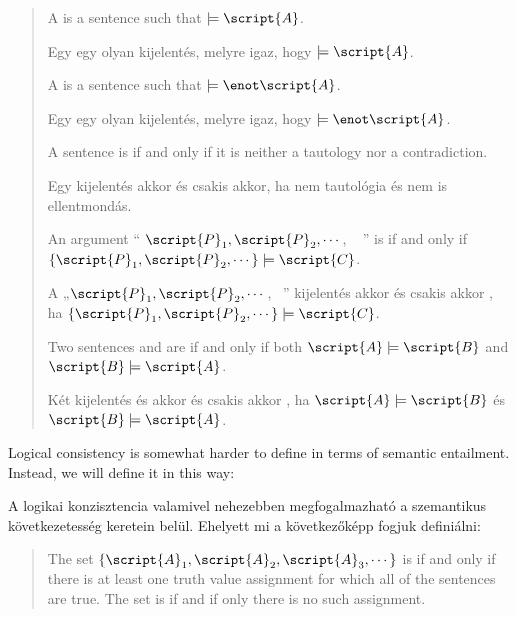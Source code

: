 
\begin{quote}
A  is a sentence   such that $\models\script{A}$.

Egy  egy olyan  kijelentés, melyre igaz, hogy $\models\script{A}$.

A  is a sentence  such that $\models\enot\script{A}$.

Egy   egy olyan  kijelentés, melyre igaz, hogy $\models\enot\script{A}$.

A sentence is  if and only if it is neither a tautology nor a contradiction.

Egy kijelentés  akkor és csakis akkor, ha nem tautológia és nem is ellentmondás.

An argument `` $\script{P}_1, \script{P}_2, \cdots$, \therefore\  '' is  if and only if $\{\script{P}_1,\script{P}_2,\cdots\}\models\script{C}$.

A „$\script{P}_1, \script{P}_2, \cdots$, \therefore\ ” kijelentés akkor és csakis akkor , ha $\{\script{P}_1,\script{P}_2,\cdots\}\models\script{C}$.

Two sentences  and  are  if and only if both $\script{A}\models\script{B}$ and $\script{B}\models\script{A}$.

Két kijelentés  és  akkor és csakis akkor , ha $\script{A}\models\script{B}$ és $\script{B}\models\script{A}$.
\end{quote}

Logical consistency is somewhat harder to define in terms of semantic entailment. Instead, we will define it in this way:

A logikai konzisztencia valamivel nehezebben megfogalmazható a szemantikus következetesség keretein belül. Ehelyett mi a következőképp fogjuk definiálni:

\begin{quote}
\label{def.consistencySL}
The set $\{\script{A}_1,\script{A}_2,\script{A}_3,\cdots\}$ is  if and only if there is at least one truth value assignment for which all of the sentences are true. The set is  if and if only there is no such assignment.
\end{quote}

